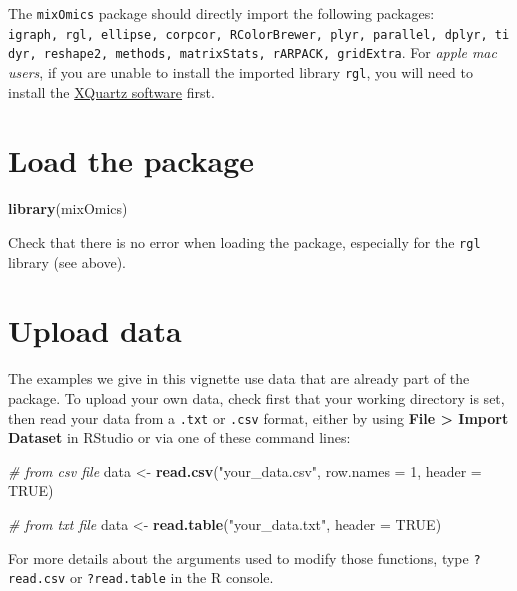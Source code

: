 \documentclass[]{book}
\newenvironment{Shaded}{\begin{snugshade}}{\end{snugshade}}
\newcommand{\CommentTok}[1]{\textcolor[rgb]{0.56,0.35,0.01}{\textit{#1}}}
\newcommand{\DataTypeTok}[1]{\textcolor[rgb]{0.13,0.29,0.53}{#1}}
\newcommand{\DecValTok}[1]{\textcolor[rgb]{0.00,0.00,0.81}{#1}}
\newcommand{\KeywordTok}[1]{\textcolor[rgb]{0.13,0.29,0.53}{\textbf{#1}}}
\newcommand{\NormalTok}[1]{#1}
\newcommand{\OtherTok}[1]{\textcolor[rgb]{0.56,0.35,0.01}{#1}}
\newcommand{\StringTok}[1]{\textcolor[rgb]{0.31,0.60,0.02}{#1}}
\begin{document}
The \texttt{mixOmics} package should directly import the following packages: \texttt{igraph,\ rgl,\ ellipse,\ corpcor,\ RColorBrewer,\ plyr,\ parallel,\ dplyr,\ tidyr,\ reshape2,\ methods,\ matrixStats,\ rARPACK,\ gridExtra}. For \emph{apple mac users}, if you are unable to install the imported library \texttt{rgl}, you will need to install the \href{https://www.xquartz.org}{XQuartz software} first.

\hypertarget{start:upload}{%
\section{Load the package}\label{start:upload}}

\begin{Shaded}
\begin{Highlighting}[]
\KeywordTok{library}\NormalTok{(mixOmics)}
\end{Highlighting}
\end{Shaded}

Check that there is no error when loading the package, especially for the \texttt{rgl} library (see above).

\hypertarget{upload-data}{%
\section{Upload data}\label{upload-data}}

The examples we give in this vignette use data that are already part of the package. To upload your own data, check first that your working directory is set, then read your data from a \texttt{.txt} or \texttt{.csv} format, either by using \textbf{File \textgreater{} Import Dataset} in RStudio or via one of these command lines:

\begin{Shaded}
\begin{Highlighting}[]
\CommentTok{# from csv file}
\NormalTok{data <-}\StringTok{ }\KeywordTok{read.csv}\NormalTok{(}\StringTok{"your_data.csv"}\NormalTok{, }\DataTypeTok{row.names =} \DecValTok{1}\NormalTok{, }\DataTypeTok{header =} \OtherTok{TRUE}\NormalTok{)}

\CommentTok{# from txt file}
\NormalTok{data <-}\StringTok{ }\KeywordTok{read.table}\NormalTok{(}\StringTok{"your_data.txt"}\NormalTok{, }\DataTypeTok{header =} \OtherTok{TRUE}\NormalTok{)}
\end{Highlighting}
\end{Shaded}

For more details about the arguments used to modify those functions, type \texttt{?read.csv} or \texttt{?read.table} in the R console.
\end{document}
